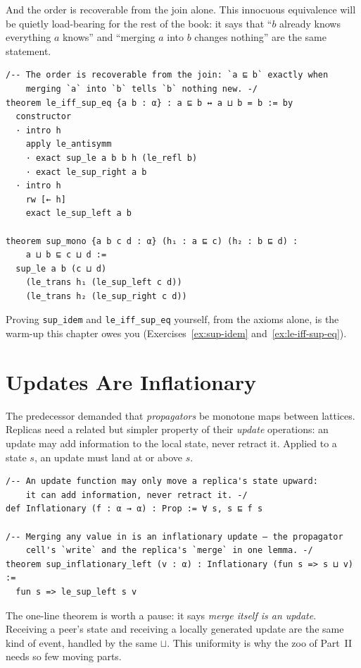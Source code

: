 \documentclass[12pt, a4paper, openright]{book}
\theoremstyle{thmstyle}
\theoremstyle{defstyle}
\newcommand{\lc}[1]{\texttt{#1}}
\begin{document}
And the order is recoverable from the join alone. This innocuous
equivalence will be quietly load-bearing for the rest of the book: it
says that ``$b$ already knows everything $a$ knows'' and ``merging $a$
into $b$ changes nothing'' are the same statement.

\begin{verbatim}
/-- The order is recoverable from the join: `a ⊑ b` exactly when
    merging `a` into `b` tells `b` nothing new. -/
theorem le_iff_sup_eq {a b : α} : a ⊑ b ↔ a ⊔ b = b := by
  constructor
  · intro h
    apply le_antisymm
    · exact sup_le a b b h (le_refl b)
    · exact le_sup_right a b
  · intro h
    rw [← h]
    exact le_sup_left a b

theorem sup_mono {a b c d : α} (h₁ : a ⊑ c) (h₂ : b ⊑ d) :
    a ⊔ b ⊑ c ⊔ d :=
  sup_le a b (c ⊔ d)
    (le_trans h₁ (le_sup_left c d))
    (le_trans h₂ (le_sup_right c d))
\end{verbatim}

Proving \lc{sup_idem} and \lc{le_iff_sup_eq} yourself, from the axioms
alone, is the warm-up this chapter owes you
(Exercises~\ref{ex:sup-idem} and~\ref{ex:le-iff-sup-eq}).

\section{Updates Are Inflationary}

The predecessor demanded that \emph{propagators} be monotone maps
between lattices. Replicas need a related but simpler property of their
\emph{update} operations: an update may add information to the local
state, never retract it. Applied to a state $s$, an update must land at
or above $s$.

\begin{verbatim}
/-- An update function may only move a replica's state upward:
    it can add information, never retract it. -/
def Inflationary (f : α → α) : Prop := ∀ s, s ⊑ f s

/-- Merging any value in is an inflationary update — the propagator
    cell's `write` and the replica's `merge` in one lemma. -/
theorem sup_inflationary_left (v : α) : Inflationary (fun s => s ⊔ v) :=
  fun s => le_sup_left s v
\end{verbatim}

The one-line theorem is worth a pause: it says \emph{merge itself is an
update}. Receiving a peer's state and receiving a locally generated
update are the same kind of event, handled by the same $\sqcup$. This
uniformity is why the zoo of Part~II needs so few moving parts.
\end{document}
